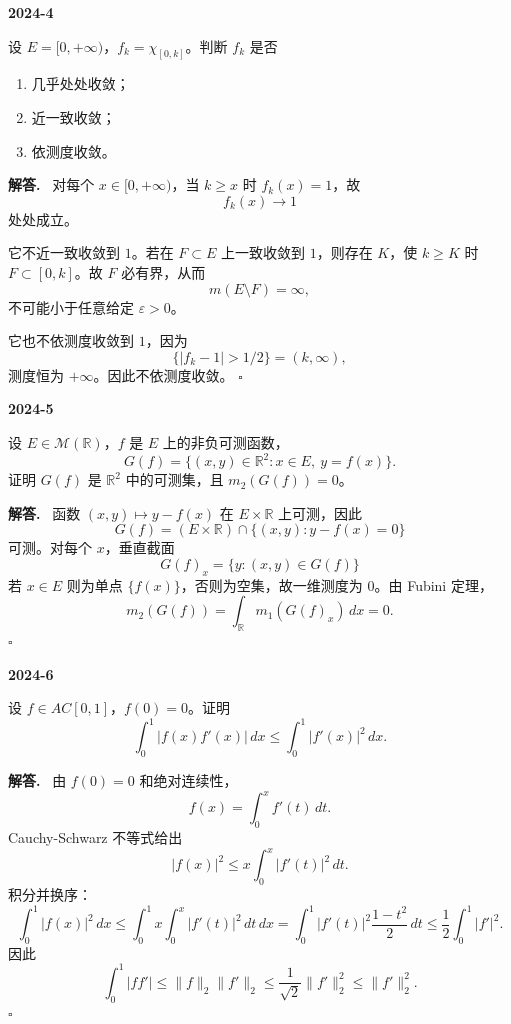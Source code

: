 \documentclass[UTF8]{ctexart}
\newcommand{\R}{\mathbb R}
\newcommand{\M}{\mathcal M}
\newcommand{\eps}{\varepsilon}
\newenvironment{problem}[1]{\par\medskip\noindent\textbf{#1}\par\smallskip}{\par}
\newenvironment{solution}{\par\noindent\textbf{解答.}\ }{\hfill$\square$\par\medskip}
\begin{document}
\begin{problem}{2024-4}
设 \(E=[0,+\infty)\)，\(f_k=\chi_{[0,k]}\)。判断 \(f_k\) 是否
\begin{enumerate}[label=(\arabic*)]
  \item 几乎处处收敛；
  \item 近一致收敛；
  \item 依测度收敛。
\end{enumerate}
\end{problem}
\begin{solution}
对每个 \(x\in[0,+\infty)\)，当 \(k\ge x\) 时 \(f_k(x)=1\)，故
\[
  f_k(x)\to1
\]
处处成立。

它不近一致收敛到 \(1\)。若在 \(F\subset E\) 上一致收敛到 \(1\)，则存在 \(K\)，使
\(k\ge K\) 时 \(F\subset[0,k]\)。故 \(F\) 必有界，从而
\[
  m(E\setminus F)=\infty,
\]
不可能小于任意给定 \(\eps>0\)。

它也不依测度收敛到 \(1\)，因为
\[
  \{|f_k-1|>1/2\}=(k,\infty),
\]
测度恒为 \(+\infty\)。因此不依测度收敛。
\end{solution}

\begin{problem}{2024-5}
设 \(E\in\M(\R)\)，\(f\) 是 \(E\) 上的非负可测函数，
\[
  G(f)=\{(x,y)\in\R^2:x\in E,\ y=f(x)\}.
\]
证明 \(G(f)\) 是 \(\R^2\) 中的可测集，且 \(m_2(G(f))=0\)。
\end{problem}
\begin{solution}
函数 \((x,y)\mapsto y-f(x)\) 在 \(E\times\R\) 上可测，因此
\[
  G(f)= (E\times\R)\cap\{(x,y):y-f(x)=0\}
\]
可测。对每个 \(x\)，垂直截面
\[
  G(f)_x=\{y:(x,y)\in G(f)\}
\]
若 \(x\in E\) 则为单点 \(\{f(x)\}\)，否则为空集，故一维测度为 \(0\)。由 Fubini 定理，
\[
  m_2(G(f))=\int_\R m_1(G(f)_x)\,dx=0.
\]
\end{solution}

\begin{problem}{2024-6}
设 \(f\in AC[0,1]\)，\(f(0)=0\)。证明
\[
  \int_0^1 |f(x)f'(x)|\,dx\le \int_0^1 |f'(x)|^2\,dx.
\]
\end{problem}
\begin{solution}
由 \(f(0)=0\) 和绝对连续性，
\[
  f(x)=\int_0^x f'(t)\,dt.
\]
Cauchy-Schwarz 不等式给出
\[
  |f(x)|^2\le x\int_0^x |f'(t)|^2\,dt.
\]
积分并换序：
\[
  \int_0^1 |f(x)|^2\,dx
  \le \int_0^1 x\int_0^x |f'(t)|^2\,dt\,dx
  =\int_0^1 |f'(t)|^2\frac{1-t^2}{2}\,dt
  \le \frac12\int_0^1|f'|^2.
\]
因此
\[
  \int_0^1 |ff'|
  \le \|f\|_2\|f'\|_2
  \le \frac1{\sqrt2}\|f'\|_2^2
  \le \|f'\|_2^2.
\]
\end{solution}
\end{document}
